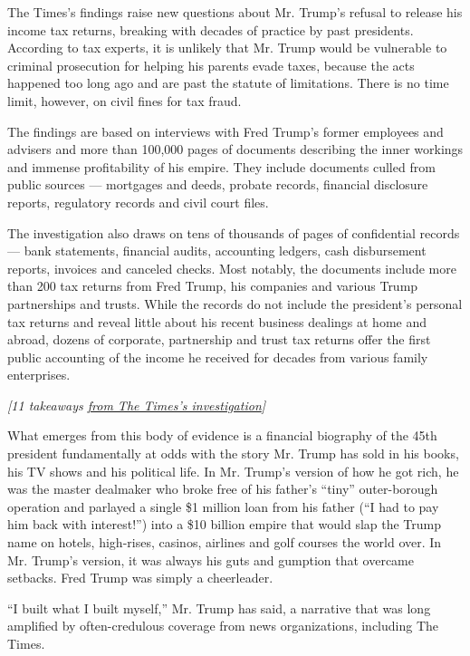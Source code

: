 The Times's findings raise new questions about Mr. Trump's refusal to
release his income tax returns, breaking with decades of practice by
past presidents. According to tax experts, it is unlikely that Mr. Trump
would be vulnerable to criminal prosecution for helping his parents
evade taxes, because the acts happened too long ago and are past the
statute of limitations. There is no time limit, however, on civil fines
for tax fraud.

The findings are based on interviews with Fred Trump's former employees
and advisers and more than 100,000 pages of documents describing the
inner workings and immense profitability of his empire. They include
documents culled from public sources --- mortgages and deeds, probate
records, financial disclosure reports, regulatory records and civil
court files.

The investigation also draws on tens of thousands of pages of
confidential records --- bank statements, financial audits, accounting
ledgers, cash disbursement reports, invoices and canceled checks. Most
notably, the documents include more than 200 tax returns from Fred
Trump, his companies and various Trump partnerships and trusts. While
the records do not include the president's personal tax returns and
reveal little about his recent business dealings at home and abroad,
dozens of corporate, partnership and trust tax returns offer the first
public accounting of the income he received for decades from various
family enterprises.

\emph{{[}11 takeaways
\href{https://www.nytimes3xbfgragh.onion/2018/10/02/us/politics/donald-trump-wealth-fred-trump.html}{from
The Times's investigation}{]}}

What emerges from this body of evidence is a financial biography of the
45th president fundamentally at odds with the story Mr. Trump has sold
in his books, his TV shows and his political life. In Mr. Trump's
version of how he got rich, he was the master dealmaker who broke free
of his father's ``tiny'' outer-borough operation and parlayed a single
\$1 million loan from his father (``I had to pay him back with
interest!'') into a \$10 billion empire that would slap the Trump name
on hotels, high-rises, casinos, airlines and golf courses the world
over. In Mr. Trump's version, it was always his guts and gumption that
overcame setbacks. Fred Trump was simply a cheerleader.

``I built what I built myself,'' Mr. Trump has said, a narrative that
was long amplified by often-credulous coverage from news organizations,
including The Times.

